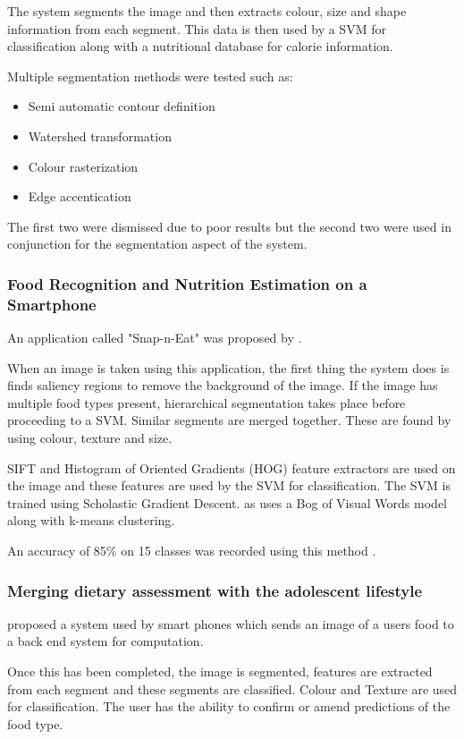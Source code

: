 The system segments the image and then extracts colour, size and shape information from each segment. This data is then used by a SVM for classification along with a nutritional database for calorie information. 

Multiple segmentation methods were tested such as:
\begin{itemize}
	\item{Semi automatic contour definition}
	\item{Watershed transformation}
	\item{Colour rasterization}
	\item{Edge accentication}
\end{itemize}
The first two were dismissed due to poor results but the second two were used in conjunction for the segmentation aspect of the system.

\subsubsection*{Food Recognition and Nutrition Estimation on a Smartphone}
An application called "Snap-n-Eat" was proposed by \textcite{snap}.

When an image is taken using this application, the first thing the system does is finds saliency regions to remove the background of the image.
If the image has multiple food types present, hierarchical segmentation takes place before proceeding to a SVM. Similar segments are merged together.
These are found by using colour, texture and size.

SIFT and Histogram of Oriented Gradients (HOG) feature extractors are used on the image and these features are used by the SVM for classification.
The SVM is trained using Scholastic Gradient Descent.
\textcite{snap} as uses a Bog of Visual Words model along with k-means clustering.

An accuracy of 85\% on 15 classes was recorded using this method \textcite{snap}.

\subsubsection*{Merging dietary assessment with the adolescent lifestyle}
\textcite{schap2014merging} proposed a system used by smart phones which sends an image of a users food to a back end system for computation.

Once this has been completed, the image is segmented, features are extracted from each segment and these segments are classified.
Colour and Texture are used for classification.
The user has the ability to confirm or amend predictions of the food type.

